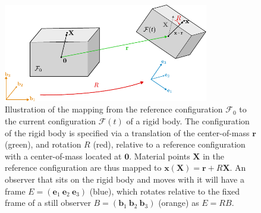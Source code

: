 \begin{figure}[t]
\centering
        \includegraphics[width=0.8\textwidth]{figs_part2/sec3.1_introduction/rigid_body_kinematics.pdf}
        \caption{Illustration of the mapping from the reference configuration $\mathcal{F}_0$ to the current configuration $\mathcal{F}(t)$ of a rigid body. The configuration of the rigid body is specified via a translation of the center-of-mass $\mathbf{r}$ (green), and rotation $R$ (red), relative to a reference configuration with a center-of-mass located at $\mathbf{0}$. Material points $\mathbf{X}$ in the reference configuration are thus mapped to $\mathbf{x}(\mathbf{X}) = \mathbf{r} + R \mathbf{X}$. An observer that sits on the rigid body and moves with it will have a frame $E = (\mathbf{e}_1\ \mathbf{e}_2\ \mathbf{e}_3)$ (blue), which rotates relative to the fixed frame of a still observer $B = (\mathbf{b}_1\ \mathbf{b}_2\ \mathbf{b}_3)$ (orange) as $E = RB$.}
        \label{fig:rigid body kinematics}
\end{figure}

